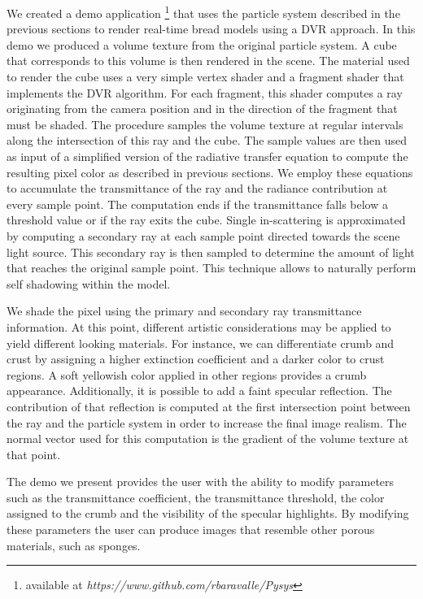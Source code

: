 We created a demo application \footnote{available at \emph{https://www.github.com/rbaravalle/Pysys}} that uses the particle system described in the previous sections to render real-time bread models using a DVR approach. 
In this demo we produced a volume texture from the original particle system.
A cube that corresponds to this volume is then rendered in the scene.
The material used to render the cube uses a very simple vertex shader and a fragment shader that implements the DVR algorithm. For each fragment, this shader computes a ray originating from the camera position and in the direction of the fragment that must be shaded. 
The procedure samples the volume texture at regular intervals along the intersection of this ray and the cube.
The sample values are then used as input of a simplified version of the radiative transfer equation to compute the resulting pixel color as described in previous sections.
We employ these equations to accumulate the transmittance of the ray and the radiance contribution at every sample point.
The computation ends if the transmittance falls below a threshold value or if the ray exits the cube. 
Single in-scattering is approximated by computing a secondary ray at each sample point directed towards the scene light source.
This secondary ray is then sampled to determine the amount of light that reaches the original sample point. 
This technique allows to naturally perform self shadowing within the model.

We shade the pixel using the primary and secondary ray transmittance information. 
At this point, different artistic considerations may be applied to yield different
looking materials.
For instance, we can differentiate crumb and crust by assigning a higher extinction coefficient and a darker color to crust regions. 
A soft yellowish color applied in other regions provides a crumb appearance.
Additionally, it is possible to add a faint specular reflection. 
The contribution of that reflection is computed at the first intersection point between the ray and the particle system in order to increase the final image realism. 
The normal vector used for this computation is the gradient of the volume texture at that point.

The demo we present provides the user with the ability to modify parameters such as the transmittance coefficient, the transmittance threshold, the color assigned to the crumb and the visibility of the specular highlights. 
By modifying these parameters the user can produce images that resemble other porous materials, such as sponges.


